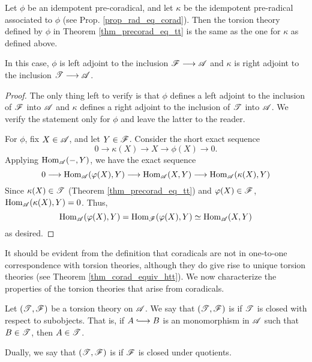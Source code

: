 \begin{cor}\label{cor_tt_ref_and_coref}
Let $\phi$ be an idempotent pre-coradical, and let $\kappa$ be the 
idempotent pre-radical associated to $\phi$ (see Prop. 
\ref{prop_rad_eq_corad}). Then the torsion theory defined by $\phi$
in Theorem \ref{thm_precorad_eq_tt} is the same as the one for
$\kappa$ as defined above.

In this case, $\phi$ is left adjoint to the inclusion $\mathscr{F} \longrightarrow 
\mathscr{A}$ and $\kappa$ is right adjoint to the inclusion $\mathscr{T} 
\longrightarrow \mathscr{A}$.
\end{cor}
\begin{proof}
The only thing left to verify is that $\phi$ defines a left 
adjoint to the inclusion of $\mathscr{F}$ into $\mathscr{A}$ and $\kappa$ 
defines a right adjoint to the inclusion of $\mathscr{T}$ into 
$\mathscr{A}$. We verify the statement only for $\phi$ and leave the 
latter to the reader.  

For $\phi$, fix $X \in \mathscr{A}$, and let $Y \in \mathscr{F}$. 
Consider the short exact sequence
\[
0 \to \kappa(X) \to X \to \phi(X) \to 0.
\]
Applying $\mathrm{Hom}_{\mathscr{A}}(-, Y)$, we have the exact sequence
\[
0 \longrightarrow \mathrm{Hom}_{\mathscr{A}}(\varphi(X), Y) \longrightarrow \mathrm{Hom}_{\mathscr{A}}(X, Y) \longrightarrow
\mathrm{Hom}_{\mathscr{A}}(\kappa(X), Y)
\]
Since $\kappa(X) \in \mathscr{T}$ (Theorem 
\ref{thm_precorad_eq_tt}) and $\varphi(X) \in \mathscr{F}$, 
$\mathrm{Hom}_{\mathscr{A}}(\kappa(X), Y) = 0$. Thus,
\[
\mathrm{Hom}_{\mathscr{A}}(\varphi(X), Y) = \mathrm{Hom}_{\mathscr{F}}(\varphi(X), Y) \simeq 
   \mathrm{Hom}_{\mathscr{A}}(X, Y)
\]
as desired.
\end{proof}

It should be evident from the definition that coradicals are not
in one-to-one correspondence with torsion theories, although they
do give rise to unique torsion theories (see Theorem 
\ref{thm_corad_equiv_htt}). We now characterize the properties of 
the torsion theories that arise from coradicals.

\begin{defn}
Let $(\mathscr{T}, \mathscr{F})$ be a torsion theory on $\mathscr{A}$. We say 
that $(\mathscr{T}, \mathscr{F})$ is  if $\mathscr{T}$ is 
closed with respect to subobjects. That is, if $A \into B$ is an 
monomorphism in $\mathscr{A}$ such that $B \in \mathscr{T}$, then $A \in 
\mathscr{T}$.

Dually, we say that $(\mathscr{T}, \mathscr{F})$ is  if
$\mathscr{F}$ is closed under quotients.
\end{defn}

